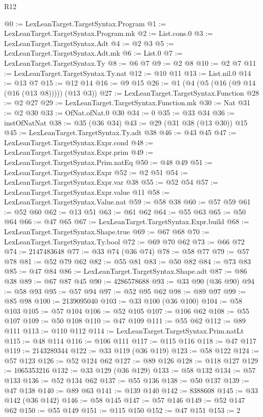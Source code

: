 \begin{lexlean}{R12}
\begin{coremodule}
@0 := LexLeanTarget.TargetSyntax.Program
@1 := LexLeanTarget.TargetSyntax.Program.mk
@2 := List.cons.{0}
@3 := LexLeanTarget.TargetSyntax.Adt
@4 := @2 @3
@5 := LexLeanTarget.TargetSyntax.Adt.mk
@6 := List.{0}
@7 := LexLeanTarget.TargetSyntax.Ty
@8 := @6 @7
@9 := @2 @8
@10 := @2 @7
@11 := LexLeanTarget.TargetSyntax.Ty.nat
@12 := @10 @11
@13 := List.nil.{0}
@14 := @13 @7
@15 := @12 @14
@16 := @9 @15
@26 := @1 (@4 (@5 (@16 (@9 @14 (@16 (@13 @8))))) (@13 @3))
@27 := LexLeanTarget.TargetSyntax.Function
@28 := @2 @27
@29 := LexLeanTarget.TargetSyntax.Function.mk
@30 := Nat
@31 := @2 @30
@33 := OfNat.ofNat.{0} @30
@34 := 0
@35 := @33 @34
@36 := instOfNatNat
@38 := @35 (@36 @34)
@43 := @29 (@31 @38 (@13 @30)) @15
@45 := LexLeanTarget.TargetSyntax.Ty.adt @38
@46 := @43 @45
@47 := LexLeanTarget.TargetSyntax.Expr.cond
@48 := LexLeanTarget.TargetSyntax.Expr.prim
@49 := LexLeanTarget.TargetSyntax.Prim.natEq
@50 := @48 @49
@51 := LexLeanTarget.TargetSyntax.Expr
@52 := @2 @51
@54 := LexLeanTarget.TargetSyntax.Expr.var @38
@55 := @52 @54
@57 := LexLeanTarget.TargetSyntax.Expr.value @11
@58 := LexLeanTarget.TargetSyntax.Value.nat
@59 := @58 @38
@60 := @57 @59
@61 := @52 @60
@62 := @13 @51
@63 := @61 @62
@64 := @55 @63
@65 := @50 @64
@66 := @47 @65
@67 := LexLeanTarget.TargetSyntax.Expr.build
@68 := LexLeanTarget.TargetSyntax.Shape.true
@69 := @67 @68
@70 := LexLeanTarget.TargetSyntax.Ty.bool
@72 := @69 @70 @62
@73 := @66 @72
@74 := 2147483648
@77 := @33 @74 (@36 @74)
@78 := @58 @77
@79 := @57 @78
@81 := @52 @79 @62
@82 := @55 @81
@83 := @50 @82
@84 := @73 @83
@85 := @47 @84
@86 := LexLeanTarget.TargetSyntax.Shape.adt
@87 := @86 @38
@89 := @67 @87 @45
@90 := 4286578688
@93 := @33 @90 (@36 @90)
@94 := @58 @93
@95 := @57 @94
@97 := @52 @95 @62
@98 := @89 @97
@99 := @85 @98
@100 := 2139095040
@103 := @33 @100 (@36 @100)
@104 := @58 @103
@105 := @57 @104
@106 := @52 @105
@107 := @106 @62
@108 := @55 @107
@109 := @50 @108
@110 := @47 @109
@111 := @55 @62
@112 := @89 @111
@113 := @110 @112
@114 := LexLeanTarget.TargetSyntax.Prim.natLt
@115 := @48 @114
@116 := @106 @111
@117 := @115 @116
@118 := @47 @117
@119 := 2143289344
@122 := @33 @119 (@36 @119)
@123 := @58 @122
@124 := @57 @123
@126 := @52 @124 @62
@127 := @89 @126
@128 := @118 @127
@129 := 1065353216
@132 := @33 @129 (@36 @129)
@133 := @58 @132
@134 := @57 @133
@136 := @52 @134 @62
@137 := @55 @136
@138 := @50 @137
@139 := @47 @138
@140 := @89 @63
@141 := @139 @140
@142 := 8388608
@145 := @33 @142 (@36 @142)
@146 := @58 @145
@147 := @57 @146
@149 := @52 @147 @62
@150 := @55 @149
@151 := @115 @150
@152 := @47 @151
@153 := 2

\end{coremodule}
\end{lexlean}
